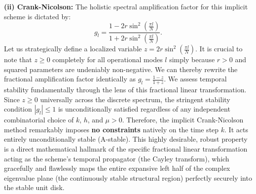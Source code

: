 \begin{solution}
\textbf{(ii) Crank-Nicolson:}
The holistic spectral amplification factor for this implicit scheme is dictated by:
\[
g_l = \frac{1 - 2r \sin^2\left(\frac{\pi l}{N}\right)}{1 + 2r \sin^2\left(\frac{\pi l}{N}\right)}.
\]
Let us strategically define a localized variable $z = 2r \sin^2\left(\frac{\pi l}{N}\right)$. It is crucial to note that $z \geq 0$ completely for all operational modes $l$ simply because $r > 0$ and squared parameters are undeniably non-negative. We can thereby rewrite the fractional amplification factor identically as $g_l = \frac{1 - z}{1 + z}$. We assess temporal stability fundamentally through the lens of this fractional linear transformation.
Since $z \ge 0$ universally across the discrete spectrum, the stringent stability condition $|g_l| \leq 1$ is unconditionally satisfied regardless of any independent combinatorial choice of $k$, $h$, and $\mu > 0$. Therefore, the implicit Crank-Nicolson method remarkably imposes \textbf{no constraints} natively on the time step $k$. It acts entirely unconditionally stable (A-stable). This highly desirable, robust property is a direct mathematical hallmark of the specific fractional linear transformation acting as the scheme's temporal propagator (the Cayley transform), which gracefully and flawlessly maps the entire expansive left half of the complex eigenvalue plane (the continuously stable structural region) perfectly securely into the stable unit disk.
\end{solution}
